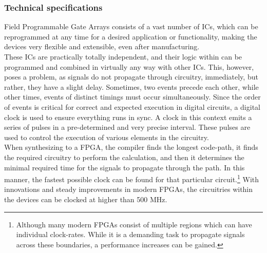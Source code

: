 \subsubsection{Technical specifications}
Field Programmable Gate Arrays consists of a vast number of ICs, which can 
be reprogrammed at any time for a desired application or functionality\cite{ni_fpga},
making the devices very flexible and extensible, even after manufacturing.\\
These ICs are practically totally independent, and their logic within can be 
programmed and combined in virtually any way with other ICs. This, however,
poses a problem, as signals do not propagate through circuitry, immediately, but
rather, they have a slight delay. 
Sometimes, two events precede each other, while other times, events of distinct 
timings must occur simultaneously.
Since the order of events is critical for correct and expected execution in 
digital circuits, a digital clock is used to ensure everything runs in sync.
A clock in this context emits a series of pulses in a pre-determined and very 
precise interval. These pulses are used to control the execution of various 
elements in the circuitry.\\
When synthesizing to a FPGA, the compiler finds the longest code-path, it finds
the required circuitry to perform the calculation, and then it determines the 
minimal required time for the signals to propagate through the path. In this 
manner, the fastest possible clock can be found for that particular circuit.\footnote{
    Although many modern FPGAs consist of multiple regions which can have individual 
    clock-rates. While it is a demanding task to propagate signals across these
    boundaries, a performance increases can be gained.
}
With innovations and steady improvements in modern FPGAs, the circuitries within
the devices can be clocked at higher than 500 MHz\cite{xilinx_fpga}.   




